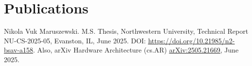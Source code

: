 \section{Publications}

\resumeSubHeadingListStart









\vspace{6pt}

\hfill\begin{minipage}{\dimexpr\textwidth-24pt}
Nikola Vuk Maruszewski. M.S. Thesis, Northwestern University, Technical Report NU-CS-2025-05,
Evanston, IL, June 2025. DOI:
\href{https://doi.org/10.21985/n2-bsav-a158}{\ul{https://doi.org/10.21985/n2-bsav-a158}}.
Also, arXiv Hardware Architecture (cs.AR)
\href{https://arxiv.org/abs/2505.21669}{\ul{arXiv:2505.21669}}, June 2025. 
\end{minipage}



\vspace{6pt}

